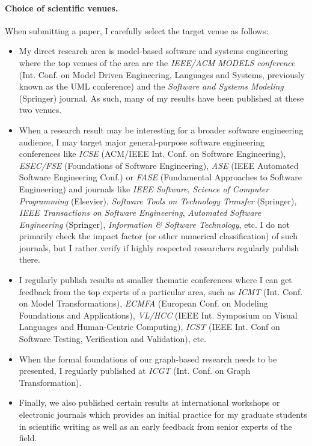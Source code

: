 \paragraph{Choice of scientific venues.} 
When submitting a paper, I carefully select the target venue as follows: 
\begin{itemize}[leftmargin=0.5cm]
\item My direct research area is model-based software and systems engineering where the top venues of the area are the \emph{IEEE/ACM MODELS conference} (Int. Conf. on Model Driven Engineering, Languages and Systems, previously known as the UML conference) and the \emph{Software and Systems Modeling} (Springer) journal. As such, many of my results have been published at these two venues. 
\item When a research result may be interesting for a broader software engineering audience, I may target major general-purpose software engineering conferences like \emph{ICSE} (ACM/IEEE Int. Conf. on Software Engineering), \emph{ESEC/FSE} (Foundations of Software Engineering),  \emph{ASE} (IEEE Automated Software Engineering Conf.) or \emph{FASE} (Fundamental Approaches to Software Engineering) and journals like \emph{IEEE Software}, \emph{Science of Computer Programming} (Elsevier), \emph{Software Tools on Technology Transfer} (Springer), \emph{IEEE Transactions on Software Engineering}, \emph{Automated Software Engineering} (Springer), \emph{Information \& Software Technology}, etc. I do not primarily check the impact factor (or other numerical classification) of such journals, but I rather verify if highly respected researchers regularly publish there.
\item I regularly publish results at smaller thematic conferences where I can get feedback from the top experts of a particular area, such as \emph{ICMT} (Int. Conf. on Model Transformations), \emph{ECMFA} (European Conf. on Modeling Foundations and Applications), \emph{VL/HCC} (IEEE Int. Symposium on Visual Languages and Human-Centric Computing), \emph{ICST} (IEEE Int. Conf on Software Testing, Verification and Validation), etc. 
\item When the formal foundations of our graph-based research needs to be presented, I regularly published at \emph{ICGT} (Int. Conf. on Graph Transformation).
\item Finally, we also published certain results at international workshops or electronic journals which provides an initial practice for my graduate students in scientific writing as well as an early feedback from senior experts of the field. 
\end{itemize}

